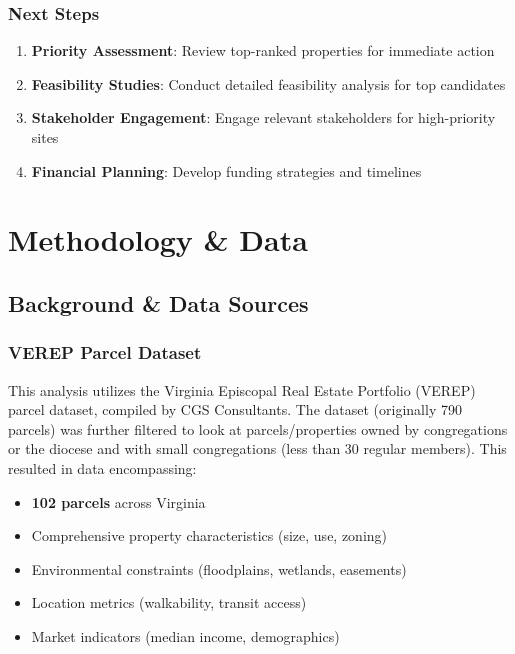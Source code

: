 \documentclass[
  letterpaper,
  DIV=11,
  numbers=noendperiod,
  oneside]{scrreprt}
\providecommand{\tightlist}{%
  \setlength{\itemsep}{0pt}\setlength{\parskip}{0pt}}
\begin{document}
\section*{Next Steps}\label{next-steps}


\begin{enumerate}
\def\labelenumi{\arabic{enumi}.}
\tightlist
\item
  \textbf{Priority Assessment}: Review top-ranked properties for
  immediate action
\item
  \textbf{Feasibility Studies}: Conduct detailed feasibility analysis
  for top candidates
\item
  \textbf{Stakeholder Engagement}: Engage relevant stakeholders for
  high-priority sites
\item
  \textbf{Financial Planning}: Develop funding strategies and timelines
\end{enumerate}

\part{Methodology \& Data}

\chapter{Background \& Data Sources}\label{background-data-sources}

\section{VEREP Parcel Dataset}\label{verep-parcel-dataset}

This analysis utilizes the Virginia Episcopal Real Estate Portfolio
(VEREP) parcel dataset, compiled by CGS Consultants. The dataset
(originally 790 parcels) was further filtered to look at
parcels/properties owned by congregations or the diocese and with small
congregations (less than 30 regular members). This resulted in data
encompassing:

\begin{itemize}
\item
  \textbf{102 parcels} across Virginia
\item
  Comprehensive property characteristics (size, use, zoning)
\item
  Environmental constraints (floodplains, wetlands, easements)
\item
  Location metrics (walkability, transit access)
\item
  Market indicators (median income, demographics)
\end{itemize}
\end{document}
